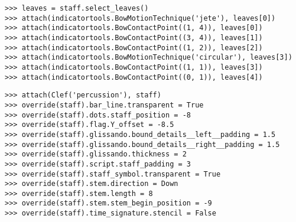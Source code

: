 \begin{comment}
<abjad>
leaves = staff.select_leaves()
attach(indicatortools.BowMotionTechnique('jete'), leaves[0])
attach(indicatortools.BowContactPoint((1, 4)), leaves[0])
attach(indicatortools.BowContactPoint((3, 4)), leaves[1])
attach(indicatortools.BowContactPoint((1, 2)), leaves[2])
attach(indicatortools.BowMotionTechnique('circular'), leaves[3])
attach(indicatortools.BowContactPoint((1, 1)), leaves[3])
attach(indicatortools.BowContactPoint((0, 1)), leaves[4])
</abjad>
\end{comment}

\begin{abjadbookoutput}
\begin{singlespacing}
\vspace{-0.5\baselineskip}
\begin{lstlisting}
>>> leaves = staff.select_leaves()
>>> attach(indicatortools.BowMotionTechnique('jete'), leaves[0])
>>> attach(indicatortools.BowContactPoint((1, 4)), leaves[0])
>>> attach(indicatortools.BowContactPoint((3, 4)), leaves[1])
>>> attach(indicatortools.BowContactPoint((1, 2)), leaves[2])
>>> attach(indicatortools.BowMotionTechnique('circular'), leaves[3])
>>> attach(indicatortools.BowContactPoint((1, 1)), leaves[3])
>>> attach(indicatortools.BowContactPoint((0, 1)), leaves[4])
\end{lstlisting}
\end{singlespacing}
\end{abjadbookoutput}

\begin{comment}
<abjad>
attach(Clef('percussion'), staff)
override(staff).bar_line.transparent = True
override(staff).dots.staff_position = -8
override(staff).flag.Y_offset = -8.5
override(staff).glissando.bound_details__left__padding = 1.5
override(staff).glissando.bound_details__right__padding = 1.5
override(staff).glissando.thickness = 2
override(staff).script.staff_padding = 3
override(staff).staff_symbol.transparent = True
override(staff).stem.direction = Down
override(staff).stem.length = 8
override(staff).stem.stem_begin_position = -9
override(staff).time_signature.stencil = False
</abjad>
\end{comment}

\begin{abjadbookoutput}
\begin{singlespacing}
\vspace{-0.5\baselineskip}
\begin{lstlisting}
>>> attach(Clef('percussion'), staff)
>>> override(staff).bar_line.transparent = True
>>> override(staff).dots.staff_position = -8
>>> override(staff).flag.Y_offset = -8.5
>>> override(staff).glissando.bound_details__left__padding = 1.5
>>> override(staff).glissando.bound_details__right__padding = 1.5
>>> override(staff).glissando.thickness = 2
>>> override(staff).script.staff_padding = 3
>>> override(staff).staff_symbol.transparent = True
>>> override(staff).stem.direction = Down
>>> override(staff).stem.length = 8
>>> override(staff).stem.stem_begin_position = -9
>>> override(staff).time_signature.stencil = False
\end{lstlisting}
\end{singlespacing}
\end{abjadbookoutput}

